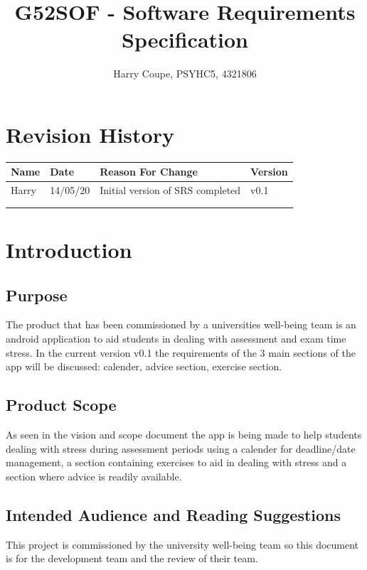 \documentclass[a4paper]{article}
\begin{document}
\title{G52SOF - Software Requirements Specification}
\author{Harry Coupe, PSYHC5, 4321806}
\maketitle
\pagebreak

\tableofcontents

\section* {Revision History}
\begin{tabular}{|m{1.5cm}|m{1.5cm}|m{9cm}|m{1.5cm}|}
	\hline
	\textbf{Name} & \textbf{Date} & \textbf{Reason For Change} & \textbf{Version}\\
	\hline
	 Harry & 14/05/20 & Initial version of SRS completed & v0.1 \\ 
	\hline
	 & & & \\
	\hline
	 & & & \\
	\hline 
\end{tabular}	
\pagebreak


\section {Introduction}
\subsection {Purpose}
The product that has been commissioned by a universities well-being team is an android application to aid students in dealing with assessment and exam time stress. In the current version v0.1 the requirements of the 3 main sections of the app will be discussed: calender, advice section, exercise section.


\subsection {Product Scope}
As seen in the vision and scope document the app is being made to help students dealing with stress during assessment periods using a calender for deadline/date management, a section containing exercises to aid in dealing with stress and a section where advice is readily available.

\subsection{Intended Audience and Reading Suggestions}
This project is commissioned by the university well-being team so this document is for the development team and the review of their team.
\end{document}
